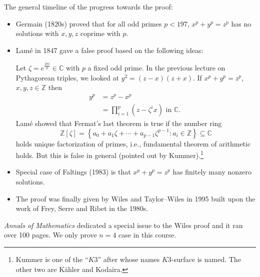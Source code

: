 \documentclass{amsbook}
\theoremstyle{plain}
\theoremstyle{definition}
\theoremstyle{remark}
\numberwithin{equation}{chapter}
\numberwithin{figure}{chapter}
\newcommand{\Z}{\mathbb{Z}}
\newcommand{\C}{\mathbb{C}}
\begin{document}
The general timeline of the progress towards the proof:
\begin{itemize}
\item Germain (1820s) proved that for all odd primes $p < 197$, $x^p + y^p = z^p$ has no solutions with $x, y, z$ coprime with $p$.
\item Lam\'e in 1847 gave a false proof based on the following ideas: 

Let $\zeta = e^{\frac{2 \pi i}p} \in \C$ with $p$ a fixed odd prime. In the previous lecture on Pythagorean triples, we looked at $y^2 = (z - x) (z + x)$. If $x^p + y^p = z^p$, $x, y, z \in \Z$ then
\begin{align}
  y^p &= z^p - x^p \\
      &= \prod_{i = 1}^p (z - \zeta^i x) \text{ in $\C$. }
\end{align}
Lam\'e showed that Fermat's last theorem is true if the number ring 
\[
\Z[\zeta] = \left\{ a_0 + a_1 \zeta + \cdots + a_{p-1} \zeta^{p-1} : a_i \in \Z \right\} \subseteq \C
\]
holds unique factorization of primes, i.e., fundamental theorem of arithmetic holds. But this is false in general (pointed out by Kummer).\footnote{Kummer is one of the ``$K3$'' after whose names $K3$-surface is named. The other two are K\"ahler and Kodaira.}
\item Special case of Faltings (1983) is that $x^p + y^p = z^p$ has finitely many nonzero solutions.
\item The proof was finally given by Wiles and Taylor--Wiles in 1995 built upon the work of Frey, Serre and Ribet in the 1980s.
\end{itemize}

\emph{Annals of Mathematics} dedicated a special issue to the Wiles proof and it ran over 100 pages. We only prove $n = 4$ case in this course. 
\end{document}
